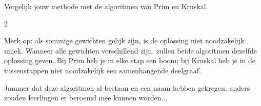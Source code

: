 \begin{nummering}

\setcounter{enumi}{6}

\item Vergelijk jouw methode met de algoritmen van Prim en Kruskal.

\end{nummering}


\eindewerktekst

\begin{multicols}{2}

Merk op: als sommige gewichten gelijk zijn, is de oplossing niet noodzakelijk uniek. Wanneer alle gewichten verschillend zijn, zullen beide algoritmen dezelfde oplossing geven. Bij Prim heb je in elke stap een boom; bij Kruskal heb je in de tussenstappen niet noodzakelijk een samenhangende deelgraaf.

Jammer dat deze algoritmen al bestaan en een naam hebben gekregen, anders zouden leerlingen er beroemd mee kunnen worden...










\end{multicols}





 


